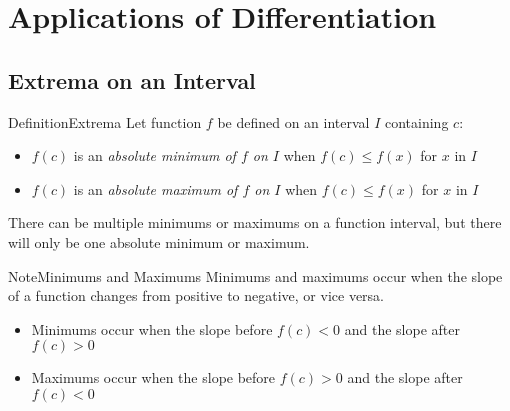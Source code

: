 \documentclass{MathNotes}
\newenvironment{definition}[1]{\begin{RedBox}{Definition}{#1}}{\end{RedBox}}
\newenvironment{note}[1]{\begin{YellowBox}{Note}{#1}}{\end{YellowBox}}
\begin{document}
\section{Applications of Differentiation}
\subsection{Extrema on an Interval}
\begin{definition}{Extrema}
	Let function $f$ be defined on an interval $I$ containing $c$:
	\begin{itemize}
		\item $f(c)$ is an \textit{absolute minimum of $f$ on $I$} when $f(c)\leq f(x)$
		      for $x$ in $I$
		\item $f(c)$ is an \textit{absolute maximum of $f$ on $I$} when $f(c)\leq f(x)$
		      for $x$ in $I$
	\end{itemize}

	There can be multiple minimums or maximums on a function interval, but
	there will only be one absolute minimum or maximum.
\end{definition}

\begin{note}{Minimums and Maximums}
	Minimums and maximums occur when the slope of a function changes
	from positive to negative, or vice versa.
	\begin{itemize}
		\item Minimums occur when the slope before $f(c)<0$ and the slope after
		      $f(c)>0$
		\item Maximums occur when the slope before $f(c)>0$ and the slope after
		      $f(c)<0$
	\end{itemize}
\end{note}
\end{document}
